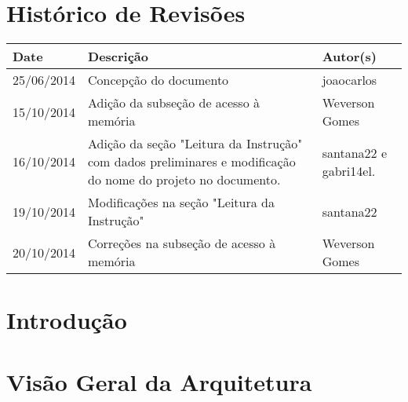 \documentclass{report}
\begin{document}
\capa
%

\chapter*{Histórico de Revisões}
  \vspace*{1cm}
  \begin{table}[ht]
    \centering
    \begin{tabular}[pos]{|m{2cm} | m{8cm} | m{4cm}|} 
      \hline
      \cellcolor[gray]{0.9}
      \textbf{Date} & \cellcolor[gray]{0.9}\textbf{Descrição} & \cellcolor[gray]{0.9}\textbf{Autor(s)}\\
      \hline
      25/06/2014 & Concepção do documento & joaocarlos \\ \hline
      15/10/2014 & Adição da subseção de acesso à memória & Weverson Gomes \\ \hline
      16/10/2014 & Adição da seção "Leitura da Instrução" com dados preliminares e modificação do nome do projeto no documento. & santana22 e gabri14el.\\ \hline
      19/10/2014 & Modificações na seção "Leitura da Instrução" & santana22 \\ \hline
      20/10/2014 & Correções na subseção de acesso à memória & Weverson Gomes \\ \hline
    \end{tabular}
  \end{table}

\tableofcontents

\chapter{Introdução}
  
	

\chapter{Visão Geral da Arquitetura}
\end{document}
